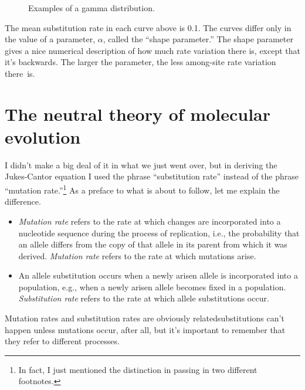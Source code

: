 \documentclass[12pt]{article}
\begin{document}
\begin{figure}
\begin{center}
\end{center}
\caption{Examples of a gamma distribution.}\label{fig:asrv}
\end{figure}

The mean substitution rate in each curve above is 0.1. The curves
differ only in the value of a parameter, $\alpha$, called the ``shape
parameter.'' The shape parameter gives a nice numerical description of
how much rate variation there is, except that it's backwards. The
larger the parameter, the less among-site rate variation
there~is.

\section*{The neutral theory of molecular evolution}

I didn't make a big deal of it in what we just went over, but in
deriving the Jukes-Cantor equation I used the phrase ``substitution
rate'' instead of the phrase ``mutation rate.''\footnote{In fact, I
  just mentioned the distinction in passing in two different
  footnotes.} As a preface to what is about to follow, let me explain
the difference.

\begin{itemize}

\item {\it Mutation rate\/} refers to the rate at which changes are
  incorporated into a nucleotide sequence during the process of
  replication, i.e., the probability that an allele differs from the
  copy of that allele in its parent from which it was derived. {\it
    Mutation rate\/} refers to the rate at which mutations
  arise.

\item An allele substitution occurs when a newly arisen allele is
  incorporated into a population, e.g., when a newly arisen allele
  becomes fixed in a population. {\it Substitution rate\/} refers to
  the rate at which allele substitutions occur.

\end{itemize}

\noindent Mutation rates and substitution rates are obviously
related{\dash}substitutions can't happen unless mutations occur, after
all{\dash}, but it's important to remember that they refer to
different processes.
\end{document}

